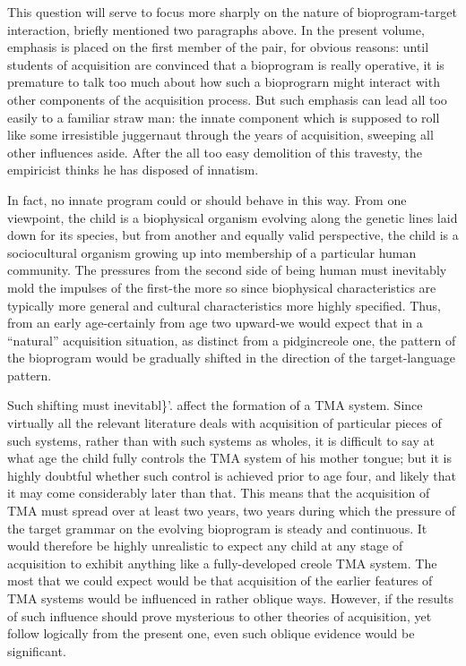 This question will serve to focus more sharply on the nature of bioprogram-target interaction, briefly mentioned two paragraphs above. In the present volume, emphasis is placed on the first member of the pair, for obvious reasons: until students of acquisition are convinced that a bioprogram is really operative, it is premature to talk too much about how such a bioprograrn might interact with other components of the acquisition process. But such emphasis can lead all too easily to a familiar straw man: the innate component which is supposed to roll like some irresistible juggernaut through the years of acquisition, sweeping all other influences aside. After the all too easy demolition of this travesty, the empiricist thinks he has disposed of innatism.

In fact, no innate program could or should behave in this way. From one viewpoint, the child is a biophysical organism evolving along the genetic lines laid down for its species, but from another and equally valid perspective, the child is a sociocultural organism growing up into membership of a particular human community. The pressures from the second side of being human must inevitably mold the impulses of the first-the more so since biophysical characteristics are typically more general and cultural characteristics more highly specified. Thus, from an early age-certainly from age two upward-we would expect that in a ``natural'' acquisition situation, as distinct from a pidgin\-creole one, the pattern of the bioprogram would be gradually shifted in the direction of the target-language pattern.

Such shifting must inevitabl\}'. affect the formation of a TMA
system. Since virtually all the relevant literature deals with acquisition of particular pieces of such systems, rather than with such systems as wholes, it is difficult to say at what age the child fully controls the TMA system of his mother tongue; but it is highly doubtful whether such control is achieved prior to age four, and likely that it may come considerably later than that. This means that the acquisition of TMA must spread over at least two years, two years during which the pres\-sure of the target grammar on the evolving bioprogram is steady and continuous. It would therefore be highly unrealistic to expect any child at any stage of acquisition to exhibit anything like a fully-developed creole TMA system. The most that we could expect would be that acquisition of the earlier features of TMA systems would be influ\-enced in rather oblique ways. However, if the results of such influence should prove mysterious to other theories of acquisition, yet follow logically from the present one, even such oblique evidence would be significant.

